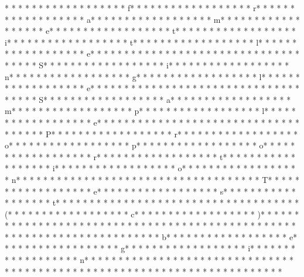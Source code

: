 * * *  * * *  * * *  *  * * *  *  * * *  * f* * *  * * *  * * *  *  * * *  *  * * *  * r* * *  * * *  * * *  *  * * *  *  * * *  * a* * *  * * *  * * *  *  * * *  *  * * *  * m* * *  * * *  * * *  *  * * *  *  * * *  * e* * *  * * *  * * *  *  * * *  *  * * *  * t* * *  * * *  * * *  *  * * *  *  * * *  * i* * *  * * *  * * *  *  * * *  *  * * *  * t* * *  * * *  * * *  *  * * *  *  * * *  * l* * *  * * *  * * *  *  * * *  *  * * *  * e* * *  * * *  * * *  *  * * *  *  * * *  * {* * *  * * *  * * *  *  * * *  *  * * *  * S* * *  * * *  * * *  *  * * *  *  * * *  * i* * *  * * *  * * *  *  * * *  *  * * *  * n* * *  * * *  * * *  *  * * *  *  * * *  * g* * *  * * *  * * *  *  * * *  *  * * *  * l* * *  * * *  * * *  *  * * *  *  * * *  * e* * *  * * *  * * *  *  * * *  *  * * *  *  * * *  * * *  * * *  *  * * *  *  * * *  * S* * *  * * *  * * *  *  * * *  *  * * *  * a* * *  * * *  * * *  *  * * *  *  * * *  * m* * *  * * *  * * *  *  * * *  *  * * *  * p* * *  * * *  * * *  *  * * *  *  * * *  * l* * *  * * *  * * *  *  * * *  *  * * *  * e* * *  * * *  * * *  *  * * *  *  * * *  *  * * *  * * *  * * *  *  * * *  *  * * *  * P* * *  * * *  * * *  *  * * *  *  * * *  * r* * *  * * *  * * *  *  * * *  *  * * *  * o* * *  * * *  * * *  *  * * *  *  * * *  * p* * *  * * *  * * *  *  * * *  *  * * *  * o* * *  * * *  * * *  *  * * *  *  * * *  * r* * *  * * *  * * *  *  * * *  *  * * *  * t* * *  * * *  * * *  *  * * *  *  * * *  * i* * *  * * *  * * *  *  * * *  *  * * *  * o* * *  * * *  * * *  *  * * *  *  * * *  * n* * *  * * *  * * *  *  * * *  *  * * *  *  * * *  * * *  * * *  *  * * *  *  * * *  * T* * *  * * *  * * *  *  * * *  *  * * *  * e* * *  * * *  * * *  *  * * *  *  * * *  * s* * *  * * *  * * *  *  * * *  *  * * *  * t* * *  * * *  * * *  *  * * *  *  * * *  *  * * *  * * *  * * *  *  * * *  *  * * *  * (* * *  * * *  * * *  *  * * *  *  * * *  * c* * *  * * *  * * *  *  * * *  *  * * *  * )* * *  * * *  * * *  *  * * *  *  * * *  * }* * *  * * *  * * *  *  * * *  *  * * *  * 
* * *  * * *  * * *  *  * * *  *  * * *  * 
* * *  * * *  * * *  *  * * *  *  * * *  * b* * *  * * *  * * *  *  * * *  *  * * *  * e* * *  * * *  * * *  *  * * *  *  * * *  * g* * *  * * *  * * *  *  * * *  *  * * *  * i* * *  * * *  * * *  *  * * *  *  * * *  * n* * *  * * *  * * *  *  * * *  *  * * *  * {* * *  * * *  * * *  *  * * *  *  * * *  *  * * *  * * *  * * *  *  * * *  *  * * *  * }* * *  * * *  * * *  *  * * *  *  * * *  * 
